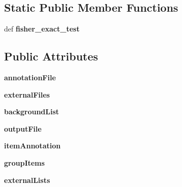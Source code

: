 \subsection*{Static Public Member Functions}
\begin{DoxyCompactItemize}
\item 
\hypertarget{classGroupOddsRatio_1_1GroupOddsRatio_abcf2a4fb2fb97c0e67ab09ac2d173186}{def {\bfseries fisher\-\_\-exact\-\_\-test}}\label{classGroupOddsRatio_1_1GroupOddsRatio_abcf2a4fb2fb97c0e67ab09ac2d173186}

\end{DoxyCompactItemize}
\subsection*{Public Attributes}
\begin{DoxyCompactItemize}
\item 
\hypertarget{classGroupOddsRatio_1_1GroupOddsRatio_a95d8128e7fadbfeecf5574a1948d5007}{{\bfseries annotation\-File}}\label{classGroupOddsRatio_1_1GroupOddsRatio_a95d8128e7fadbfeecf5574a1948d5007}

\item 
\hypertarget{classGroupOddsRatio_1_1GroupOddsRatio_aed00835777234db9526bfce190ec0323}{{\bfseries external\-Files}}\label{classGroupOddsRatio_1_1GroupOddsRatio_aed00835777234db9526bfce190ec0323}

\item 
\hypertarget{classGroupOddsRatio_1_1GroupOddsRatio_ac6719d1ab33663a7d851e96a63d1f64a}{{\bfseries background\-List}}\label{classGroupOddsRatio_1_1GroupOddsRatio_ac6719d1ab33663a7d851e96a63d1f64a}

\item 
\hypertarget{classGroupOddsRatio_1_1GroupOddsRatio_aea816fc10148c6500f8601de55df50a7}{{\bfseries output\-File}}\label{classGroupOddsRatio_1_1GroupOddsRatio_aea816fc10148c6500f8601de55df50a7}

\item 
\hypertarget{classGroupOddsRatio_1_1GroupOddsRatio_a5c764fdbd9e3c52834882220c8064a0d}{{\bfseries item\-Annotation}}\label{classGroupOddsRatio_1_1GroupOddsRatio_a5c764fdbd9e3c52834882220c8064a0d}

\item 
\hypertarget{classGroupOddsRatio_1_1GroupOddsRatio_abdf82605ade4b85a1662640a95d42ff6}{{\bfseries group\-Items}}\label{classGroupOddsRatio_1_1GroupOddsRatio_abdf82605ade4b85a1662640a95d42ff6}

\item 
\hypertarget{classGroupOddsRatio_1_1GroupOddsRatio_a1d9561c3bc16df236b1ad08cfb0839bc}{{\bfseries external\-Lists}}\label{classGroupOddsRatio_1_1GroupOddsRatio_a1d9561c3bc16df236b1ad08cfb0839bc}


\end{DoxyCompactItemize}
